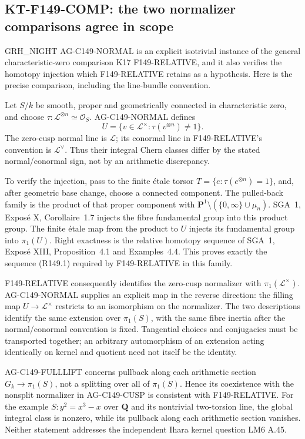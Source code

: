 \documentclass[11pt,a4paper]{article}
\theoremstyle{definition}
\begin{document}


\subsection{KT-F149-COMP: the two normalizer comparisons agree in scope}
\label{sec:kt-f149-comp}

GRH\_NIGHT AG-C149-NORMAL is an explicit isotrivial instance
of the general characteristic-zero comparison K17
F149-RELATIVE, and it also verifies the homotopy injection
which F149-RELATIVE retains as a hypothesis. Here is the
precise comparison, including the line-bundle convention.

Let $S/k$ be smooth, proper and geometrically connected in
characteristic zero, and choose
$\tau:\mathcal L^{\otimes n}\simeq\mathcal O_S$.
AG-C149-NORMAL defines
\[
 U=\{v\in\mathcal L^\times:
                         \tau(v^{\otimes n})\ne1\}.
\]
The zero-cusp normal line is $\mathcal L$; its conormal
line in F149-RELATIVE's convention is $\mathcal L^\vee$.
Thus their integral Chern classes differ by the stated
normal/conormal sign, not by an arithmetic discrepancy.

To verify the injection, pass to the finite \'etale torsor
$T=\{e:\tau(e^{\otimes n})=1\}$, and, after geometric
base change, choose a connected component. The pulled-back
family is the product of that proper component with
$\mathbf P^1\setminus(\{0,\infty\}\cup\mu_n)$.
SGA~1, Expos\'e X, Corollaire~1.7 injects the fibre
fundamental group into this product group. The finite
\'etale map from the product to $U$ injects its fundamental
group into $\pi_1(U)$. Right exactness is the relative
homotopy sequence of SGA~1, Expos\'e XIII, Proposition~4.1
and Examples~4.4. This proves exactly the sequence
(R149.1) required by F149-RELATIVE in this family.

F149-RELATIVE consequently identifies the zero-cusp
normalizer with $\pi_1(\mathcal L^\times)$.
AG-C149-NORMAL supplies an explicit map in the reverse
direction: the filling map $U\to\mathcal L^\times$
restricts to an isomorphism on the normalizer. The two
descriptions identify the same extension over $\pi_1(S)$,
with the same fibre inertia after the normal/conormal
convention is fixed. Tangential choices and conjugacies
must be transported together; an arbitrary automorphism
of an extension acting identically on kernel and quotient
need not itself be the identity.

AG-C149-FULLLIFT concerns pullback along each arithmetic
section $G_k\to\pi_1(S)$, not a splitting over all of
$\pi_1(S)$. Hence its coexistence with the nonsplit
normalizer in AG-C149-CUSP is consistent with
F149-RELATIVE. For the example
$S:y^2=x^3-x$ over $\mathbf Q$ and its nontrivial
two-torsion line, the global integral class is nonzero,
while its pullback along each arithmetic section vanishes.
Neither statement addresses the independent Ihara kernel
question LM6 A.45.
\end{document}

